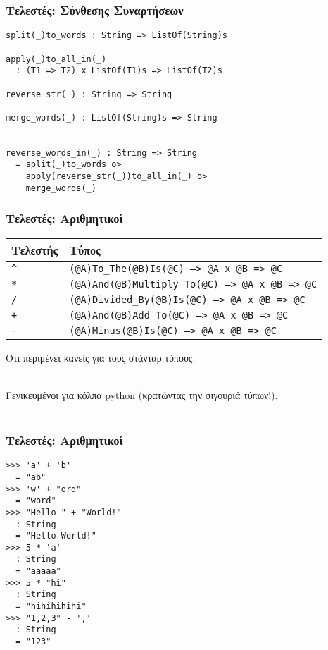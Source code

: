 \documentclass{beamer}
\def\e{\foreignlanguage{english}}
\begin{document}
\begin{frame}[fragile]

\frametitle{Τελεστές: Σύνθεσης Συναρτήσεων}

\begin{otherlanguage}{english}
\begin{verbatim}
split(_)to_words : String => ListOf(String)s

apply(_)to_all_in(_)
  : (T1 => T2) x ListOf(T1)s => ListOf(T2)s

reverse_str(_) : String => String

merge_words(_) : ListOf(String)s => String


reverse_words_in(_) : String => String
  = split(_)to_words o>
    apply(reverse_str(_))to_all_in(_) o>
    merge_words(_)
\end{verbatim}
\end{otherlanguage}

\end{frame}

\begin{frame}

\frametitle{Τελεστές: Αριθμητικοί}

\begin{center}
\begin{tabular}{ |P{1.5cm}|P{8.9cm}| }
 \hline
 Τελεστής & Τύπος
 \\
 \hline
 \e{\texttt{\^}} & \e{\texttt{(@A)To\_The(@B)Is(@C) --> @A x @B => @C}}
 \\
 \e{\texttt{*}} & \e{\texttt{(@A)And(@B)Multiply\_To(@C) --> @A x @B => @C}}
 \\
 \e{\texttt{/}} & \e{\texttt{(@A)Divided\_By(@B)Is(@C) --> @A x @B => @C}}
 \\
 \e{\texttt{+}} & \e{\texttt{(@A)And(@B)Add\_To(@C) --> @A x @B => @C}}
 \\
 \e{\texttt{-}} & \e{\texttt{(@A)Minus(@B)Is(@C) --> @A x @B => @C}}
 \\
 \hline
\end{tabular}
\end{center}

Ότι περιμένει κανείς για τους στάνταρ τύπους.
\\~\

Γενικευμένοι για κόλπα \e{python} (κρατώντας την σιγουριά τύπων!).
\\~\

\end{frame}

\begin{frame}[fragile]

\frametitle{Τελεστές: Αριθμητικοί}

\begin{otherlanguage}{english}
\begin{verbatim}
>>> 'a' + 'b'
  = "ab"
>>> 'w' + "ord"
  = "word"
>>> "Hello " + "World!"
  : String
  = "Hello World!"
>>> 5 * 'a'
  : String
  = "aaaaa"
>>> 5 * "hi"
  : String
  = "hihihihihi"
>>> "1,2,3" - ','
  : String
  = "123"
\end{verbatim}
\end{otherlanguage}

\end{frame}
\end{document}
